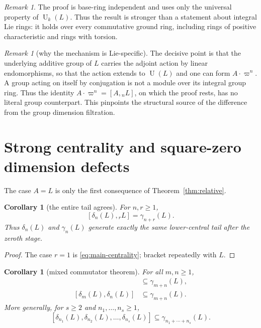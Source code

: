 \documentclass[a4paper,11pt,reqno]{amsart}
\newtheorem{corollary}[theorem]{Corollary}
\theoremstyle{definition}
\theoremstyle{remark}
\newtheorem{remark}[theorem]{Remark}
\newcommand{\U}{\operatorname U}
\newcommand{\aug}{\varpi}
\newcommand{\dlt}{\delta}
\newcommand{\gm}{\gamma}
\begin{document}
\begin{remark}
The proof is base-ring independent and uses only the universal property of
$\U_k(L)$.  Thus the result is stronger than a statement about integral Lie
rings: it holds over every commutative ground ring, including rings of positive
characteristic and rings with torsion.
\end{remark}

\begin{remark}[why the mechanism is Lie-specific]
The decisive point is that the underlying additive group of $L$ carries the
adjoint action by linear endomorphisms, so that the action extends to
$\U(L)$ and one can form $A\cdot\aug^n$.  A group acting on itself by
conjugation is not a module over its integral group ring.  Thus the identity
$A\cdot\aug^n=[A,{}_nL]$, on which the proof rests, has no literal group
counterpart.  This pinpoints the structural source of the difference from the
group dimension filtration.
\end{remark}

\section{Strong centrality and square-zero dimension defects}

The case $A=L$ is only the first consequence of
Theorem~\ref{thm:relative}.

\begin{corollary}[the entire tail agrees]\label{cor:tails}
For $n,r\geq1$,
\begin{equation}\label{eq:tails}
                  [\dlt_n(L),{}_rL]=\gm_{n+r}(L).
\end{equation}
Thus $\dlt_n(L)$ and $\gm_n(L)$ generate exactly the same lower-central
tail after the zeroth stage.
\end{corollary}

\begin{proof}
The case $r=1$ is \eqref{eq:main-centrality}; bracket repeatedly with $L$.
\end{proof}

\begin{corollary}[mixed commutator theorem]\label{cor:mixed}
For all $m,n\geq1$,
\begin{align}
 [\gm_m(L),\dlt_n(L)]&\subseteq\gm_{m+n}(L),
                                                        \label{eq:gamma-delta}\\
 [\dlt_m(L),\dlt_n(L)]&\subseteq\gm_{m+n}(L).
                                                        \label{eq:delta-delta}
\end{align}
More generally, for $s\geq2$ and $n_1,\ldots,n_s\geq1$,
\begin{equation}\label{eq:iterated-delta}
 [\dlt_{n_1}(L),\dlt_{n_2}(L),\ldots,\dlt_{n_s}(L)]
       \subseteq\gm_{n_1+\cdots+n_s}(L).
\end{equation}
\end{corollary}
\end{document}
